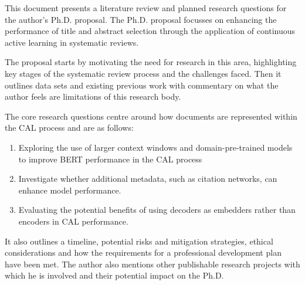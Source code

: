 \documentclass[../main.tex]{subfiles}
\begin{document}
This document presents a literature review and planned research questions for the author's Ph.D. proposal. The Ph.D. proposal focusses on enhancing the performance of title and abstract selection through the application of continuous active learning in systematic reviews.

The proposal starts by motivating the need for research in this area, highlighting key stages of the systematic review process and the challenges faced.  Then it outlines data sets and existing previous work with commentary on what the author feels are limitations of this research body.

The core research questions centre around how documents are represented within the CAL process and are as follows:

\begin{enumerate}
    \item Exploring the use of larger context windows and domain-pre-trained models to improve BERT performance in the CAL process
    \item Investigate whether additional metadata, such as citation networks, can enhance model performance.
    \item Evaluating the potential benefits of using decoders as embedders rather than encoders in CAL performance.
\end{enumerate}

It also outlines a timeline, potential risks and mitigation strategies, ethical considerations and how the requirements for a professional development plan have been met. The author also mentions other publishable research projects with which he is involved and their potential impact on the Ph.D.
\end{document}
